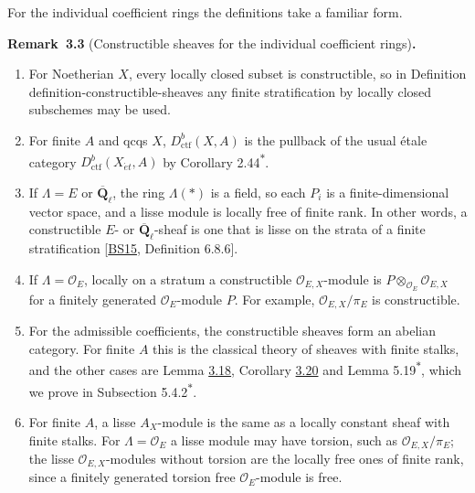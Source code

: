 \documentclass[11pt]{article}
\newenvironment{bpstatement}[2]{\par\addvspace{0.6\baselineskip}\noindent\textbf{#1}#2\textbf{.}\enspace\ignorespaces}
  {\par\addvspace{0.4\baselineskip}}
\newcommand{\bpout}[1]{#1\textsuperscript{\hyperlink{bp-outside}{\ensuremath{\ast}}}}
\begin{document}
\label{bp10}%
For the individual coefficient rings the definitions take a familiar form.

\label{bp11}%
\begin{bpstatement}{Remark~3.3}{ (Constructible sheaves for the individual coefficient rings)}
\begin{enumerate}
\item For Noetherian \(X\), every locally closed subset is constructible, so in Definition definition-constructible-sheaves any finite stratification by locally closed subschemes may be used.
\item For finite \(A\) and qcqs \(X\), \(D^b_{\mathrm{ctf}}(X,A)\) is the pullback of the usual étale category \(D^b_{\mathrm{ctf}}(X_{\acute{e}t},A)\) by Corollary \bpout{2.44}.
\item If \(\Lambda=E\) or \(\overline{\mathbf Q}_\ell\), the ring \(\Lambda(*)\) is a field, so each \(P_i\) is a finite-dimensional vector space, and a lisse module is locally free of finite rank. In other words, a constructible \(E\)- or \(\overline{\mathbf Q}_\ell\)-sheaf is one that is lisse on the strata of a finite stratification [\hyperref[bp93]{BS15}, Definition 6.8.6].
\item If \(\Lambda=\mathcal O_E\), locally on a stratum a constructible \(\mathcal O_{E,X}\)-module is \(P\otimes_{\mathcal O_E}\mathcal O_{E,X}\) for a finitely generated \(\mathcal O_E\)-module \(P\). For example, \(\mathcal O_{E,X}/\pi_E\) is constructible.
\item For the admissible coefficients, the constructible sheaves form an abelian category. For finite \(A\) this is the classical theory of sheaves with finite stalks, and the other cases are Lemma \hyperref[bp56]{3.18}, Corollary \hyperref[bp61]{3.20} and Lemma \bpout{5.19}, which we prove in Subsection \bpout{5.4.2}.
\item For finite \(A\), a lisse \(A_X\)-module is the same as a locally constant sheaf with finite stalks. For \(\Lambda=\mathcal O_E\) a lisse module may have torsion, such as \(\mathcal O_{E,X}/\pi_E\); the lisse \(\mathcal O_{E,X}\)-modules without torsion are the locally free ones of finite rank, since a finitely generated torsion free \(\mathcal O_E\)-module is free.
\end{enumerate}
\end{bpstatement}
\end{document}
